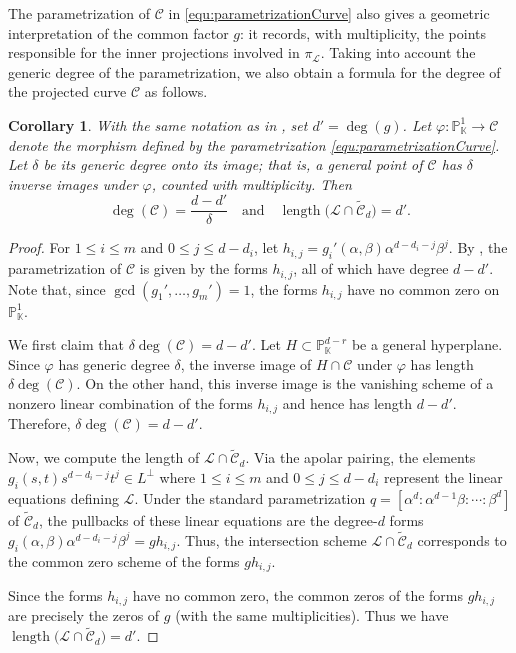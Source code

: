 \documentclass[a4paper, 11pt]{amsart}
\numberwithin{theorem}{section}
\newtheorem{corollary}[theorem]{Corollary}
\theoremstyle{definition}
\numberwithin{equation}{section}
\begin{document}
The parametrization of $\mathcal{C}$ in \eqref{equ:parametrizationCurve} also gives a geometric interpretation of the common factor $g$: it records, with multiplicity, the points responsible for the inner projections involved in $\pi_{\mathcal L}$.
Taking into account the generic degree of the parametrization, we also obtain a formula for the degree of the projected curve $\mathcal{C}$ as follows.
\begin{corollary}\label{cor:detectInnerProjections}
With the same notation as in , set
$d'=\deg(g)$.
Let $\varphi:\mathbb{P}^1_{\mathbb{K}}\longrightarrow\mathcal{C}$ denote the morphism defined by the parametrization \eqref{equ:parametrizationCurve}.
Let $\delta$ be its generic degree onto its image; that is, a general point of $\mathcal{C}$ has $\delta$ inverse images under $\varphi$, counted with multiplicity.
Then
\[
\deg(\mathcal{C})=\frac{d-d'}{\delta}
\quad\text{and}\quad
\operatorname{length}
\bigl(\mathcal L\cap\widetilde{\mathcal{C}}_d\bigr)=d'.
\]
\end{corollary}

\begin{proof}
For $1\leq i\leq m$ and $0\leq j\leq d-d_i$, let $h_{i,j} = g_i'(\alpha,\beta)\alpha^{d-d_i-j}\beta^j$.
By , the parametrization of
$\mathcal{C}$ is given by the forms $h_{i,j}$, all of which have degree $d-d'$.
Note that, since $\gcd(g_1',\dots,g_m')=1$, the forms $h_{i,j}$ have no common zero on $\mathbb{P}^1_{\mathbb{K}}$.

We first claim that $\delta\deg(\mathcal{C})=d-d'$.
Let $H\subset\mathbb{P}^{d-r}_{\mathbb{K}}$ be a general hyperplane.
Since $\varphi$ has generic degree $\delta$, the inverse image of $H\cap\mathcal{C}$ under $\varphi$ has length $\delta\deg(\mathcal{C})$. 
On the other hand, this inverse image is the vanishing scheme of a nonzero linear combination of the forms $h_{i,j}$ and hence has length $d-d'$. 
Therefore, $\delta\deg(\mathcal{C})=d-d'$.

Now, we compute the length of $\mathcal L\cap\widetilde{\mathcal{C}}_d$.
Via the apolar pairing, the elements $g_i(s,t)s^{d-d_i-j}t^j\in L^\perp$ where $1\leq i\leq m$ and $0\leq j\leq d-d_i$ represent the linear equations defining $\mathcal L$.
Under the standard parametrization $q=[\alpha^d:\alpha^{d-1}\beta:\cdots:\beta^d]$ of $\widetilde{\mathcal{C}}_d$, the pullbacks of these linear equations are the degree-$d$ forms $g_i(\alpha,\beta)\alpha^{d-d_i-j}\beta^j=g h_{i,j}$.
Thus, the intersection scheme $\mathcal L\cap\widetilde{\mathcal{C}}_d$ corresponds to the common zero scheme of the forms $g h_{i,j}$.

Since the forms $h_{i,j}$ have no common zero, the common zeros of the forms $g h_{i,j}$ are precisely the zeros of $g$ (with the same multiplicities). 
Thus we have $\operatorname{length} \bigl(\mathcal L\cap\widetilde{\mathcal{C}}_d\bigr)=d'$.
\end{proof}
\end{document}
